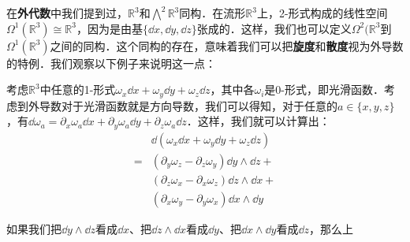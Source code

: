 在\textbf{外代数}中我们提到过，$\mathbb{R}^3$和$\bigwedge^2\mathbb{R}^3$同构．在流形$\mathbb{R}^3$上，2-形式构成的线性空间$\Omega^1(\mathbb{R}^3)\cong\mathbb{R}^3$，因为是由基$\{\dd x, \dd y, \dd z\}$张成的．这样，我们也可以定义$\Omega^2(\mathbb{R}^3$到$\Omega^1(\mathbb{R}^3)$之间的同构．这个同构的存在，意味着我们可以把\textbf{旋度}和\textbf{散度}视为外导数的特例．我们观察以下例子来说明这一点：

考虑$\mathbb{R}^3$中任意的1-形式$\omega_x\dd x+\omega_y\dd y+\omega_z\dd z$，其中各$\omega_i$是0-形式，即光滑函数．考虑到外导数对于光滑函数就是方向导数，我们可以得知，对于任意的$a\in\{x,y,z\}$，有$\dd\omega_a=\partial_x\omega_a\dd x+\partial_y\omega_a\dd y+\partial_z\omega_a\dd z$．这样，我们就可以计算出：
\begin{equation}\label{ExtDer_eq1}
\begin{aligned}
&\dd(\omega_x\dd x+\omega_y\dd y+\omega_z\dd z)\\=&(\partial_y\omega_z-\partial_z\omega_y)\dd y\wedge\dd z+\\&(\partial_z\omega_x-\partial_x\omega_z)\dd z\wedge\dd x+\\&(\partial_x\omega_y-\partial_y\omega_x)\dd x\wedge\dd y
\end{aligned}
\end{equation}

如果我们把$\dd y\wedge\dd z$看成$\dd x$、把$\dd z\wedge\dd x$看成$\dd y$、把$\dd x\wedge\dd y$看成$\dd z$，那么上




